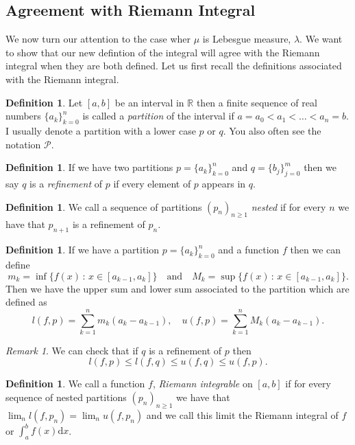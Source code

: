 \documentclass[11pt]{article}
\theoremstyle{definition}
\newtheorem{dfn}[thm]{Definition}
\theoremstyle{remark}
\newtheorem{remark}[thm]{Remark}
\begin{document}
\subsection{Agreement with Riemann Integral}
We now turn our attention to the case wher $\mu$ is Lebesgue measure, $\lambda$. We want to show that our new defintion of the integral will agree with the Riemann integral when they are both defined.  Let us first recall the definitions associated with the Riemann integral.

\begin{dfn}
Let $[a,b]$ be an interval in $\mathbb{R}$ then a finite sequence of real numbers $\{a_k\}_{k=0}^n$ is called a \emph{partition} of the interval if $a=a_0 < a_1 < \dots<a_n=b$. I usually denote a partition with a lower case $p$ or $q$. You also often see the notation $\mathscr{P}$.
\end{dfn}

\begin{dfn}
If we have two partitions $p = \{a_k\}_{k=0}^n$ and $q=\{b_j\}_{j=0}^m$ then we say $q$ is a \emph{refinement} of $p$ if every element of $p$ appears in $q$.
\end{dfn}

\begin{dfn}
We call a sequence of partitions $(p_n)_{n \geq 1}$ \emph{nested} if for every $n$ we have that $p_{n+1}$ is a refinement of $p_n$.
\end{dfn}

\begin{dfn}
If we have a partition $p = \{a_k\}_{k=0}^n$ and a function $f$ then we can define 
\[ m_k = \inf \{ f(x) \,:\, x \in [a_{k-1},a_k] \} \quad \mbox{and}\quad M_k = \sup\{ f(x)\,:\, x \in [a_{k-1},a_k]\}. \] Then we have the upper sum and lower sum associated to the partition which are defined as
\[ l(f,p) = \sum_{k=1}^n m_k(a_k-a_{k-1}), \quad u(f,p) = \sum_{k=1}^n M_k (a_k-a_{k-1}). \]
\end{dfn}
\begin{remark}
We can check that if $q$ is a refinement of $p$ then
\[ l(f,p) \leq l(f,q) \leq u(f,q) \leq u(f,p). \]
\end{remark}
\begin{dfn}
We call a function $f$, \emph{Riemann integrable} on $[a,b]$ if for every sequence of nested partitions $(p_n)_{n \geq 1}$ we have that $\lim_n l(f,p_n) = \lim_n u(f,p_n)$ and we call this limit the Riemann integral of $f$ or $\int_a^b f(x)\mathrm{d}x$.
\end{dfn}
\end{document}
